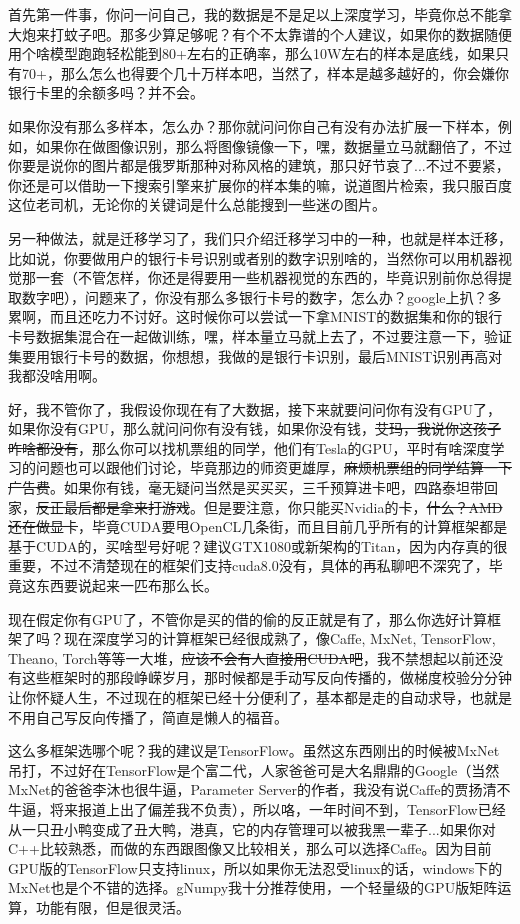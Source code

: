 \documentclass{article}
\begin{document}
首先第一件事，你问一问自己，我的数据是不是足以上深度学习，毕竟你总不能拿大炮来打蚊子吧。那多少算足够呢？有个不太靠谱的个人建议，如果你的数据随便用个啥模型跑跑轻松能到80+左右的正确率，那么10W左右的样本是底线，如果只有70+，那么怎么也得要个几十万样本吧，当然了，样本是越多越好的，你会嫌你银行卡里的余额多吗？并不会。

如果你没有那么多样本，怎么办？那你就问问你自己有没有办法扩展一下样本，例如，如果你在做图像识别，那么将图像镜像一下，嘿，数据量立马就翻倍了，不过你要是说你的图片都是俄罗斯那种对称风格的建筑，那只好节哀了...不过不要紧，你还是可以借助一下搜索引擎来扩展你的样本集的嘛，说道图片检索，我只服百度这位老司机，无论你的关键词是什么总能搜到一些迷の图片。

另一种做法，就是迁移学习了，我们只介绍迁移学习中的一种，也就是样本迁移，比如说，你要做用户的银行卡号识别或者别的数字识别啥的，当然你可以用机器视觉那一套（不管怎样，你还是得要用一些机器视觉的东西的，毕竟识别前你总得提取数字吧），问题来了，你没有那么多银行卡号的数字，怎么办？google上扒？多累啊，而且还吃力不讨好。这时候你可以尝试一下拿MNIST的数据集和你的银行卡号数据集混合在一起做训练，嘿，样本量立马就上去了，不过要注意一下，验证集要用银行卡号的数据，你想想，我做的是银行卡识别，最后MNIST识别再高对我都没啥用啊。

好，我不管你了，我假设你现在有了大数据，接下来就要问问你有没有GPU了，如果你没有GPU，那么就问问你有没有钱，如果你没有钱，\sout{艾玛，我说你这孩子咋啥都没有}，那么你可以找机票组的同学，他们有Tesla的GPU，平时有啥深度学习的问题也可以跟他们讨论，毕竟那边的师资更雄厚，\sout{麻烦机票组的同学结算一下广告费}。如果你有钱，毫无疑问当然是买买买，三千预算进卡吧，四路泰坦带回家，\sout{反正最后都是拿来打游戏}。但是要注意，你只能买Nvidia的卡，\sout{什么？AMD还在做显卡}，毕竟CUDA要甩OpenCL几条街，而且目前几乎所有的计算框架都是基于CUDA的，买啥型号好呢？建议GTX1080或新架构的Titan，因为内存真的很重要，不过不清楚现在的框架们支持cuda8.0没有，具体的再私聊吧不深究了，毕竟这东西要说起来一匹布那么长。

现在假定你有GPU了，不管你是买的借的偷的反正就是有了，那么你选好计算框架了吗？现在深度学习的计算框架已经很成熟了，像Caffe, MxNet, TensorFlow, Theano, Torch等等一大堆，\sout{应该不会有人直接用CUDA吧}，我不禁想起以前还没有这些框架时的那段峥嵘岁月，那时候都是手动写反向传播的，做梯度校验分分钟让你怀疑人生，不过现在的框架已经十分便利了，基本都是走的自动求导，也就是不用自己写反向传播了，简直是懒人的福音。

这么多框架选哪个呢？我的建议是TensorFlow。虽然这东西刚出的时候被MxNet吊打，不过好在TensorFlow是个富二代，人家爸爸可是大名鼎鼎的Google（当然MxNet的爸爸李沐也很牛逼，Parameter Server的作者，我没有说Caffe的贾扬清不牛逼，将来报道上出了偏差我不负责），所以咯，一年时间不到，TensorFlow已经从一只丑小鸭变成了丑大鸭，港真，它的内存管理可以被我黑一辈子...如果你对C++比较熟悉，而做的东西跟图像又比较相关，那么可以选择Caffe。因为目前GPU版的TensorFlow只支持linux，所以如果你无法忍受linux的话，windows下的MxNet也是个不错的选择。gNumpy我十分推荐使用，一个轻量级的GPU版矩阵运算，功能有限，但是很灵活。
\end{document}
